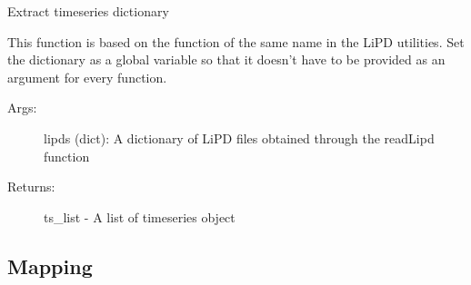 \documentclass[letterpaper,10pt,english]{sphinxmanual}
\begin{document}

\begin{fulllineitems}
\label{\detokenize{Main:pyleoclim.fetchTs}}
Extract timeseries dictionary

This function is based on the function of the same name in the LiPD utilities.
Set the dictionary as a global variable so that it doesn’t have to be
provided as an argument for every function.
\begin{description}
\item[{Args:}] \leavevmode
lipds (dict): A dictionary of LiPD files obtained through the
readLipd function

\item[{Returns:}] \leavevmode
ts\_list - A list of timeseries object

\end{description}

\end{fulllineitems}



\subsection{Mapping}
\label{\detokenize{Main:mapping}}
\end{document}
